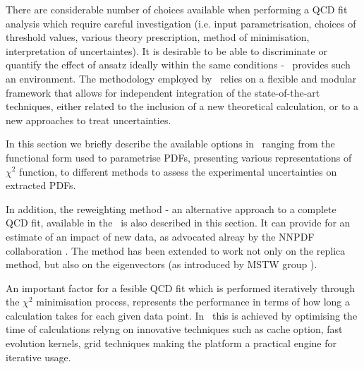 



There are considerable number of choices available when performing a QCD fit analysis which require careful investigation (i.e. input parametrisation, choices of threshold values, various theory prescription, method of minimisation, interpretation of uncertaintes).
%
 It is desirable to be able to discriminate or quantify the effect of ansatz ideally within the same conditions -
\fitter\ provides such an environment.
%
The methodology employed by \fitter\  relies on a flexible and modular
framework that allows for independent integration of the state-of-the-art techniques, either related to the inclusion of a new theoretical calculation, or to a new approaches to treat uncertainties. 
%

In this section we briefly describe the available options in \fitter\ ranging from the functional form used to parametrise PDFs, presenting various representations of $\chi^2$ function, to different methods to assess the experimental uncertainties on extracted PDFs.

In addition, the reweighting method - an alternative approach to a complete QCD fit, available in the \fitter\ is also described in this section. It can provide for an estimate of an impact of new data, as advocated 
alreay by the NNPDF collaboration \cite{Ball:2011gg,Ball:2010gb}.
The method has been extended to work not only on the replica method, 
but also on the eigenvectors (as introduced by MSTW group \cite{Watt:2012tq}).

An important factor for a fesible QCD fit which is performed iteratively through the $\chi^2$ minimisation process,  represents the performance in terms of how long a calculation takes for each given data point.
In \fitter\ this is achieved by optimising the time of calculations relyng on innovative techniques such as cache option, fast evolution kernels, grid techniques making the platform a practical engine for iterative usage.



